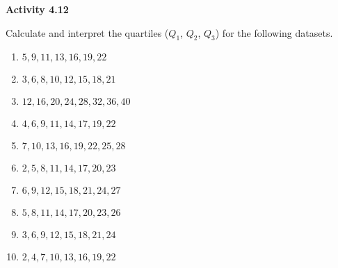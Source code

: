 \vspace{0.3ex}
\noindent\textbf{Activity 4.12}

\vspace{0.2ex}

Calculate and interpret the quartiles (\(Q_1\), \(Q_2\), \(Q_3\)) for the following datasets.

\begin{enumerate}
    \item \(5, 9, 11, 13, 16, 19, 22\)  
    \item \(3, 6, 8, 10, 12, 15, 18, 21\)  
    \item \(12, 16, 20, 24, 28, 32, 36, 40\)  
    \item \(4, 6, 9, 11, 14, 17, 19, 22\)  
    \item \(7, 10, 13, 16, 19, 22, 25, 28\)  
    \item \(2, 5, 8, 11, 14, 17, 20, 23\)  
    \item \(6, 9, 12, 15, 18, 21, 24, 27\)  
    \item \(5, 8, 11, 14, 17, 20, 23, 26\)  
    \item \(3, 6, 9, 12, 15, 18, 21, 24\)  
    \item \(2, 4, 7, 10, 13, 16, 19, 22\)  
\end{enumerate}
